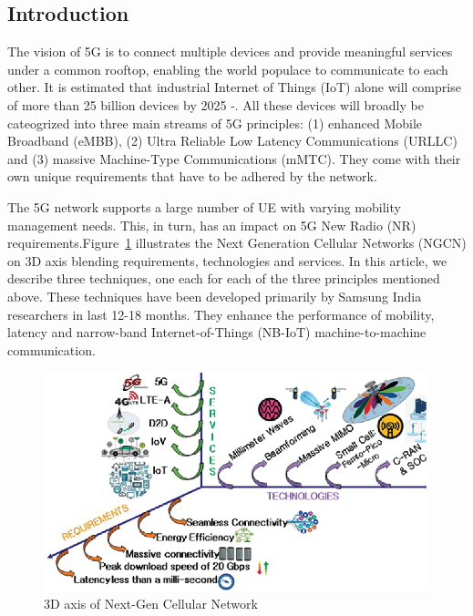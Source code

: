 \begin{multicols}{2}

\section{Introduction}
 
The vision of 5G is to connect multiple devices and provide meaningful services under a common rooftop, enabling the world populace to communicate to each other. It is estimated that industrial Internet of Things (IoT) alone will comprise of more than 25 billion devices by 2025 \cite{art1-key01}-\cite{art1-key02}. All these devices will broadly be cateogrized into three main streams of 5G principles: (1) enhanced Mobile Broadband (eMBB), (2) Ultra Reliable Low Latency Communications (URLLC) and (3) massive Machine-Type Communications (mMTC). They come with their own unique requirements that have to be adhered by the network.

The 5G network supports a large number of UE with varying mobility management needs. This, in turn, has an impact on 5G New Radio (NR) requirements.\break Figure~\ref{chap1-fig01} illustrates the Next Generation Cellular Networks (NGCN) on 3D axis blending requirements, technologies and services. In this article, we describe three techniques, one each for each of the three principles mentioned above. These techniques have been developed primarily by Samsung India researchers in last 12-18 months. They enhance the performance of mobility, latency and narrow-band Internet-of-Things (NB-IoT) machine-to-machine communication. 

\setcounter{figure}{0}
\begin{figure}[H]
\centering
\includegraphics[scale=1.3]{src/Figures/chap1/chap1-fig01.jpg}
\caption{3D axis of Next-Gen Cellular Network}\label{chap1-fig01}
\vspace{-.4cm}
\end{figure}


\end{multicols}
